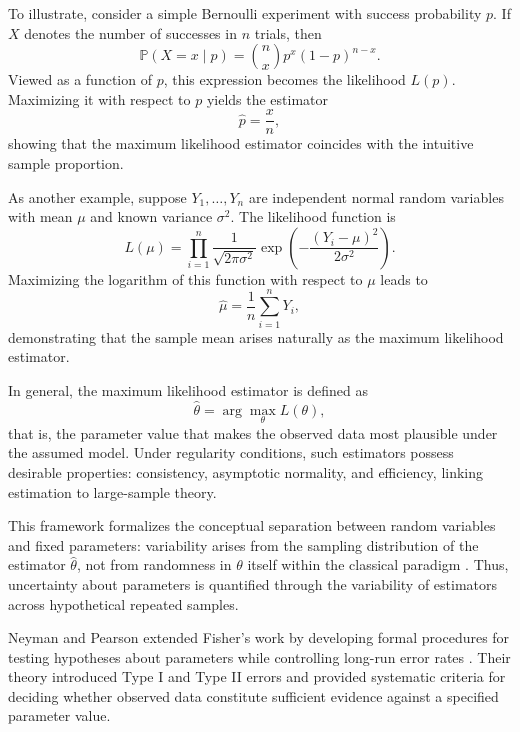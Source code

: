 \medskip

To illustrate, consider a simple Bernoulli experiment with success probability \(p\). If \(X\) denotes the number of successes in \(n\) trials, then
\[
\mathbb{P}(X=x \mid p) = \binom{n}{x} p^x (1-p)^{n-x}.
\]
Viewed as a function of \(p\), this expression becomes the likelihood \(L(p)\). Maximizing it with respect to \(p\) yields the estimator
\[
\hat{p} = \frac{x}{n},
\]
showing that the maximum likelihood estimator coincides with the intuitive sample proportion.

\medskip

As another example, suppose \(Y_1,\dots,Y_n\) are independent normal random variables with mean \(\mu\) and known variance \(\sigma^2\). The likelihood function is
\[
L(\mu) = \prod_{i=1}^n 
\frac{1}{\sqrt{2\pi\sigma^2}}
\exp\!\left(
-\frac{(Y_i-\mu)^2}{2\sigma^2}
\right).
\]
Maximizing the logarithm of this function with respect to \(\mu\) leads to
\[
\hat{\mu} = \frac{1}{n}\sum_{i=1}^n Y_i,
\]
demonstrating that the sample mean arises naturally as the maximum likelihood estimator.

\medskip

In general, the maximum likelihood estimator is defined as
\[
\hat{\theta} = \arg\max_{\theta} L(\theta),
\]
that is, the parameter value that makes the observed data most plausible under the assumed model. Under regularity conditions, such estimators possess desirable properties: consistency, asymptotic normality, and efficiency, linking estimation to large-sample theory.

\medskip

This framework formalizes the conceptual separation between random variables and fixed parameters: variability arises from the sampling distribution of the estimator \(\hat{\theta}\), not from randomness in \(\theta\) itself within the classical paradigm \cite{degroot_2012_probability}. Thus, uncertainty about parameters is quantified through the variability of estimators across hypothetical repeated samples.

\medskip

Neyman and Pearson extended Fisher’s work by developing formal procedures for testing hypotheses about parameters while controlling long-run error rates \cite{pearson_neyman_1933_efficient}. Their theory introduced Type I and Type II errors and provided systematic criteria for deciding whether observed data constitute sufficient evidence against a specified parameter value.

\medskip

